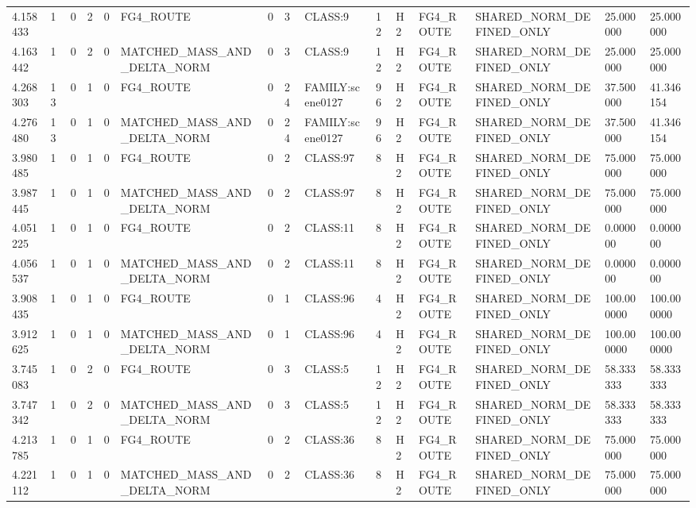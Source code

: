 \begin{tabular}{lllllllllllllll}
4.158433 & 1 & 0 & 2 & 0 & FG4\_ROUTE & 0 & 3 & CLASS:9 & 12 & H2 & FG4\_ROUTE & SHARED\_NORM\_DEFINED\_ONLY & 25.000000 & 25.000000 \\
4.163442 & 1 & 0 & 2 & 0 & MATCHED\_MASS\_AND\_DELTA\_NORM & 0 & 3 & CLASS:9 & 12 & H2 & FG4\_ROUTE & SHARED\_NORM\_DEFINED\_ONLY & 25.000000 & 25.000000 \\
4.268303 & 13 & 0 & 1 & 0 & FG4\_ROUTE & 0 & 24 & FAMILY:scene0127 & 96 & H2 & FG4\_ROUTE & SHARED\_NORM\_DEFINED\_ONLY & 37.500000 & 41.346154 \\
4.276480 & 13 & 0 & 1 & 0 & MATCHED\_MASS\_AND\_DELTA\_NORM & 0 & 24 & FAMILY:scene0127 & 96 & H2 & FG4\_ROUTE & SHARED\_NORM\_DEFINED\_ONLY & 37.500000 & 41.346154 \\
3.980485 & 1 & 0 & 1 & 0 & FG4\_ROUTE & 0 & 2 & CLASS:97 & 8 & H2 & FG4\_ROUTE & SHARED\_NORM\_DEFINED\_ONLY & 75.000000 & 75.000000 \\
3.987445 & 1 & 0 & 1 & 0 & MATCHED\_MASS\_AND\_DELTA\_NORM & 0 & 2 & CLASS:97 & 8 & H2 & FG4\_ROUTE & SHARED\_NORM\_DEFINED\_ONLY & 75.000000 & 75.000000 \\
4.051225 & 1 & 0 & 1 & 0 & FG4\_ROUTE & 0 & 2 & CLASS:11 & 8 & H2 & FG4\_ROUTE & SHARED\_NORM\_DEFINED\_ONLY & 0.000000 & 0.000000 \\
4.056537 & 1 & 0 & 1 & 0 & MATCHED\_MASS\_AND\_DELTA\_NORM & 0 & 2 & CLASS:11 & 8 & H2 & FG4\_ROUTE & SHARED\_NORM\_DEFINED\_ONLY & 0.000000 & 0.000000 \\
3.908435 & 1 & 0 & 1 & 0 & FG4\_ROUTE & 0 & 1 & CLASS:96 & 4 & H2 & FG4\_ROUTE & SHARED\_NORM\_DEFINED\_ONLY & 100.000000 & 100.000000 \\
3.912625 & 1 & 0 & 1 & 0 & MATCHED\_MASS\_AND\_DELTA\_NORM & 0 & 1 & CLASS:96 & 4 & H2 & FG4\_ROUTE & SHARED\_NORM\_DEFINED\_ONLY & 100.000000 & 100.000000 \\
3.745083 & 1 & 0 & 2 & 0 & FG4\_ROUTE & 0 & 3 & CLASS:5 & 12 & H2 & FG4\_ROUTE & SHARED\_NORM\_DEFINED\_ONLY & 58.333333 & 58.333333 \\
3.747342 & 1 & 0 & 2 & 0 & MATCHED\_MASS\_AND\_DELTA\_NORM & 0 & 3 & CLASS:5 & 12 & H2 & FG4\_ROUTE & SHARED\_NORM\_DEFINED\_ONLY & 58.333333 & 58.333333 \\
4.213785 & 1 & 0 & 1 & 0 & FG4\_ROUTE & 0 & 2 & CLASS:36 & 8 & H2 & FG4\_ROUTE & SHARED\_NORM\_DEFINED\_ONLY & 75.000000 & 75.000000 \\
4.221112 & 1 & 0 & 1 & 0 & MATCHED\_MASS\_AND\_DELTA\_NORM & 0 & 2 & CLASS:36 & 8 & H2 & FG4\_ROUTE & SHARED\_NORM\_DEFINED\_ONLY & 75.000000 & 75.000000 \\

\end{tabular}
